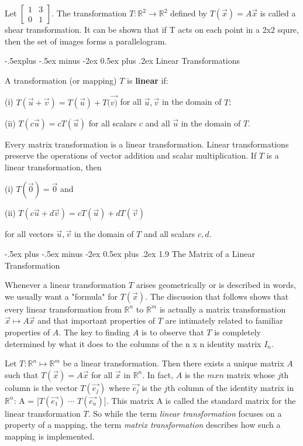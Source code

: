 \documentclass[10pt,landscape]{article}
\makeatletter
\renewcommand{\section}{\@startsection{section}{1}{0mm}%
                                {-.5ex plus -.5ex minus -2ex}%
                                {0.5ex plus .2ex}%
                                {\normalfont\footnotesize\bfseries}}
\renewcommand{\subsection}{\@startsection{subsection}{2}{0mm}%
                                {-.5explus -.5ex minus -2ex}%
                                {0.5ex plus .2ex}%
                                {\normalfont\footnotesize\bfseries}}
\makeatother
\begin{document}
\begin{multicols}{4}
{{Let $\left[
\begin{array}{rrr}
1 & 3 \\ 0 & 1 
\end{array}
\right]$. The transformation $T \colon \mathbb{R}^2 \to \mathbb{R}^2$ defined by $T(\vec{x})=A\vec{x}$ is called a shear transformation. It can be shown that if T acts on each point in a 2x2 squre, then the set of images forms a parallelogram. 

\subsection{Linear Transformations}

A transformation (or mapping) $T$ is \textbf{linear} if: 

(i) $T(\vec{u}+\vec{v}) = T(\vec{u}) + T(\vec{v)}$ for all $\vec{u}, \vec{v}$ in the domain of $T$;

(ii) $T(c\vec{u}) = cT(\vec{u})$ for all scalars $c$ and all $\vec{u}$ in the domain of $T$. 

Every matrix transformation is a linear transformation. Linear transformations preserve the operations of vector addition and scalar multiplication. If $T$ is a linear transformation, then

(i) $T(\vec{0})=\vec{0}$ and 

(ii) $T(c\vec{u}+d\vec{v}) = cT(\vec{u}) + dT(\vec{v})$

for all vectors $\vec{u}, \vec{v}$ in the domain of $T$ and all scalars $c, d$.

\section{1.9 The Matrix of a Linear Transformation}

Whenever a linear transformation $T$ arises geometrically or is described in words, we usually want a "formula" for $T(\vec{x})$. The discussion that follows shows that every linear transformation from $\mathbb{R}^n$ to $\mathbb{R}^m$ is actually a matrix transformation $\vec{x} \mapsto A\vec{x}$ and that important properties of $ T$ are intimately related to familiar properties of $A$. The key to finding $A$ is to observe that $T$ is completely determined by what it does to the columns of the n x n identity matrix $I_n$. 

Let $T \colon \mathbb{R}^n \mapsto \mathbb{R}^m$ be a linear transformation. Then there exists a unique matrix $A$ such that $T(\vec{x}) = A\vec{x}$ for all $\vec{x}$ in $\mathbb{R}^n$. In fact, $A$ is the $m x n$ matrix whose $j$th column is the vector $T(\vec{e_j})$ where $\vec{e_j}$ is the $j$th column of the identity matrix in $\mathbb{R}^n$: A = [$T(\vec{e_1})$  $\cdots$  $T(\vec{e_n})$]. This matrix A is called the standard matrix for the linear transformation $T$.  So while the term \textit{linear transformation} focuses on a property of a mapping, the term \textit{matrix transformation} describes how such a mapping is implemented.

}}
\end{multicols}
\end{document}
